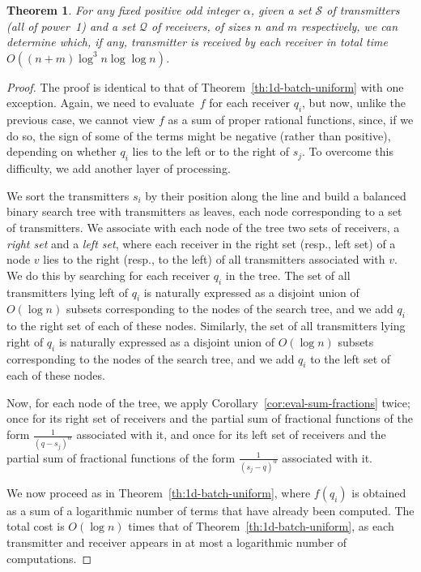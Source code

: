 \documentclass[11pt]{article}
\newtheorem{theorem}{Theorem}[section]
\theoremstyle{remark}
\def\Q{\mathcal{Q}}
\def\S{\mathcal{S}}
\begin{document}
\begin{theorem}
  \label{th:1d-batch-uniform-odd}
  For any fixed positive odd integer $\alpha$, given a set $\S$ of
  transmitters (all of power~1) and a set $\Q$
  of receivers, of sizes $n$ and $m$ respectively, we can determine
  which, if any, transmitter is received by each receiver in total
  time $O((n + m) \log^3 n \log \log n)$.
\end{theorem}

\begin{proof}
  The proof is identical to that of Theorem~\ref{th:1d-batch-uniform} with one exception.
Again, we need to evaluate~$f$ for each receiver $q_i$, but now, unlike the previous case, we cannot view $f$ as a sum of proper rational functions, since, if we do so, the sign of some of the terms might be negative (rather than positive), depending on whether $q_i$ lies to the left or to the right of $s_j$. To overcome this difficulty, we add another layer of processing.
	
	
  We sort the transmitters $s_i$ by their position along the line and build a balanced binary search tree with transmitters as leaves, each node corresponding to a set of transmitters.  We associate with each node of the tree two sets of receivers, a \emph{right set} and a \emph{left set}, where each receiver in the right set (resp., left set) of a node $v$ lies to the right (resp., to the left) of all transmitters associated with $v$. We do this by searching for each receiver $q_i$ in the tree.  The set of all transmitters lying left of $q_i$ is naturally expressed as a disjoint union of $O(\log n)$ subsets corresponding to the nodes of the search tree, and we add $q_i$ to the right set of each of these nodes.
  Similarly, the set of all transmitters lying right of $q_i$ is naturally expressed as a disjoint union of $O(\log n)$ subsets corresponding to the nodes of the search tree, and we add $q_i$ to the left set of each of these nodes.
	
  Now, for each node of the tree, we apply Corollary~\ref{cor:eval-sum-fractions} twice; once for its right set of receivers and the partial sum of fractional functions of the form $\frac{1}{(q-s_j)^\alpha}$ associated with it, and once for its left set of receivers and the partial sum of fractional functions of the form $\frac{1}{(s_j-q)^\alpha}$ associated with it.
		
  We now proceed as in Theorem~\ref{th:1d-batch-uniform}, where $f(q_i)$ is obtained as a sum of a logarithmic number of terms that have already been computed. The total cost is $O(\log n)$ times that of Theorem~\ref{th:1d-batch-uniform}, as each transmitter and receiver appears in at most a logarithmic number of computations.
\end{proof}
\end{document}
